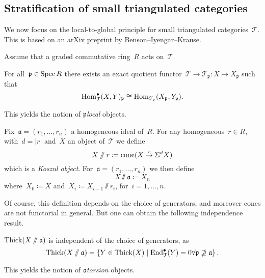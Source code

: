 \documentclass[10pt,a4paper]{article}
\begin{document}
\subsection{Stratification of small triangulated categories}
We now focus on the local-to-global principle for small triangulated categories~$\mathcal{T}$. This is based on an arXiv preprint by Benson--Iyengar--Krause.

Assume that a graded commutative ring~$R$ acts on~$\mathcal{T}$.
\begin{proposition}
  For all~$\mathfrak{p}\in\operatorname{Spec} R$ there exists an exact quotient functor~$\mathcal{T}\to\mathcal{T}_{\mathfrak{p}}:X\mapsto X_{\mathfrak{p}}$ such that
  \begin{equation}
    \operatorname{Hom}_{\mathcal{T}}^\bullet(X,Y)_{\mathfrak{p}}\cong\operatorname{Hom}_{\mathcal{T}_{\mathfrak{p}}}(X_{\mathfrak{p}},Y_{\mathfrak{p}}).
  \end{equation}
\end{proposition}
This yields the notion of \emph{$\mathfrak{p}$\dash local} objects.

Fix~$\mathfrak{a}=(r_1,\dotsc,r_n)$ a homogeneous ideal of~$R$. For any homogeneous~$r\in R$, with~$d=|r|$ and~$X$ an object of~$\mathcal{T}$ we define
\begin{equation}
  X\mathbin{/\mkern-6mu/} r\coloneqq\operatorname{cone}(X\overset{r}\to\Sigma^dX)
\end{equation}
which is a \emph{Koszul object}. For~$\mathfrak{a}=(r_1,\dotsc,r_n)$ we then define
\begin{equation}
  X\sslash\mathfrak{a}\coloneqq X_n
\end{equation}
where~$X_0\coloneqq X$ and~$X_i\coloneqq X_{i-1}\sslash r_i$, for~$i=1,\dotsc,n$.

Of course, this definition depends on the choice of generators, and moreover cones are not functorial in general. But one can obtain the following independence result.
\begin{lemma}
  $\operatorname{Thick}(X\mathbin{/\mkern-6mu/}{\mathfrak{a}})$ is independent of the choice of generators, as
  \begin{equation}
    \operatorname{Thick}(X\mathbin{/\mkern-6mu/}\mathfrak{a})=\left\{ Y\in\operatorname{Thick}(X)\mid\operatorname{End}_{\mathcal{T}}^\bullet(Y)=0\forall\mathfrak{p}\nsupseteq\mathfrak{a} \right\}.
  \end{equation}
\end{lemma}
This yields the notion of \emph{$\mathfrak{a}$\dash torsion} objects.
\end{document}
